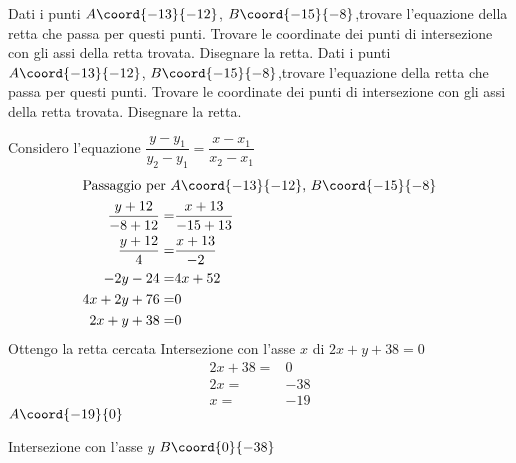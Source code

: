 \begin{exercise}
	Dati i punti  $A\coord{-13}{-12}$, $B\coord{-15}{-8}$,trovare l'equazione della retta che passa per questi punti. Trovare le coordinate dei punti di intersezione con gli assi della retta trovata. Disegnare la retta.
	\tcblower
	Dati i punti  $A\coord{-13}{-12}$, $B\coord{-15}{-8}$,trovare l'equazione della retta che passa per questi punti. Trovare le coordinate dei punti di intersezione con gli assi della retta trovata. Disegnare la retta.
	
	Considero l'equazione  $\dfrac{y-y_1}{y_2-y_1}=\dfrac{x-x_1}{x_2-x_1}$
	\begin{align*}
		\intertext{Passaggio per  $A\coord{-13}{-12}$, $B\coord{-15}{-8}$}
		\dfrac{y+12}{-8+12}=&\dfrac{x+13}{-15+13}\\
		\dfrac{y+12}{4}=&\dfrac{x+13}{-2}\\
		-2y-24=&4x+52\\
		4x+2y+76=&0\\
		2x+y+38=&0\\
	\end{align*}
	Ottengo la retta cercata
	Intersezione con l'asse $x$ di $2x+y+38=0$
	\begin{align*}
		2x+38=&0\\
		2x=&-38\\
		x=&-19
	\end{align*}
	$A\coord{-19}{0}$
	
	Intersezione con l'asse $y$
	$B\coord{0}{-38}$
		\begin{center}
			
		\end{center}
\end{exercise}
